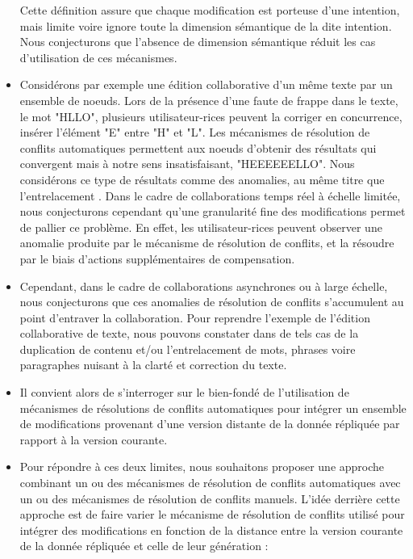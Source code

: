 \begin{itemize}
        Cette définition assure que chaque modification est porteuse d'une intention, mais limite voire ignore toute la dimension sémantique de la dite intention.
        Nous conjecturons que l'absence de dimension sémantique réduit les cas d'utilisation de ces mécanismes.
    \item Considérons par exemple une édition collaborative d'un même texte par un ensemble de noeuds.
        Lors de la présence d'une faute de frappe dans le texte, \eg le mot "HLLO", plusieurs utilisateur-rices peuvent la corriger en concurrence, \ie insérer l'élément "E" entre "H" et "L".
        Les mécanismes de résolution de conflits automatiques permettent aux noeuds d'obtenir des résultats qui convergent mais à notre sens insatisfaisant, \eg "HEEEEEELLO".
        Nous considérons ce type de résultats comme des anomalies, au même titre que l'entrelacement \cite{2019-interleaving-anomalies-collaborative-editors-kleppmann}.
        Dans le cadre de collaborations temps réel à échelle limitée, nous conjecturons cependant qu'une granularité fine des modifications permet de pallier ce problème.
        En effet, les utilisateur-rices peuvent observer une anomalie produite par le mécanisme de résolution de conflits, et la résoudre par le biais d'actions supplémentaires de compensation.
    \item Cependant, dans le cadre de collaborations asynchrones ou à large échelle, nous conjecturons que ces anomalies de résolution de conflits s'accumulent au point d'entraver la collaboration.
        Pour reprendre l'exemple de l'édition collaborative de texte, nous pouvons constater dans de tels cas de la duplication de contenu et/ou l'entrelacement de mots, phrases voire paragraphes nuisant à la clarté et correction du texte.
    \item Il convient alors de s'interroger sur le bien-fondé de l'utilisation de mécanismes de résolutions de conflits automatiques pour intégrer un ensemble de modifications provenant d'une version distante de la donnée répliquée par rapport à la version courante.
    \item Pour répondre à ces deux limites, nous souhaitons proposer une approche combinant un ou des mécanismes de résolution de conflits automatiques avec un ou des mécanismes de résolution de conflits manuels.
        L'idée derrière cette approche est de faire varier le mécanisme de résolution de conflits utilisé pour intégrer des modifications en fonction de la distance entre la version courante de la donnée répliquée et celle de leur génération :

\end{itemize}
